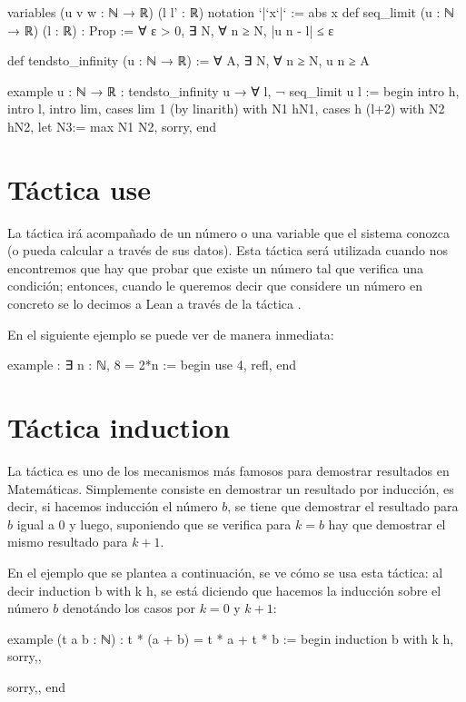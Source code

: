\begin{leancode}
variables (u v w : ℕ → ℝ) (l l' : ℝ)
notation `|`x`|` := abs x
def seq_limit (u : ℕ → ℝ) (l : ℝ) : Prop :=
∀ ε > 0, ∃ N, ∀ n ≥ N, |u n - l| ≤ ε

def tendsto_infinity (u : ℕ → ℝ) := ∀ A, ∃ N, ∀ n ≥ N, u n ≥ A

example {u : ℕ → ℝ} : tendsto_infinity u → ∀ l, ¬ seq_limit u l :=
begin
  intro h,
  intro l,
  intro lim,
  cases lim 1 (by linarith) with N1 hN1,
  cases h (l+2) with N2 hN2,
  let N3:= max N1 N2,
  sorry,
end
\end{leancode}

\section{Táctica use}
La táctica  irá acompañado de un número o una variable que
el sistema conozca (o pueda calcular a través de sus datos). Esta táctica será
utilizada cuando nos encontremos que hay que probar que existe un número tal
que verifica una condición; entonces, cuando le queremos decir que considere un
número en concreto se lo decimos a Lean a través de la táctica
.

En el siguiente ejemplo se puede ver de manera inmediata:

\begin{leancode}
example : ∃ n : ℕ, 8 = 2*n :=
begin
  use 4,
  refl,
end
\end{leancode}


\section{Táctica induction}
La táctica  es uno de los mecanismos más famosos
para demostrar resultados en Matemáticas. Simplemente consiste en demostrar
un resultado por inducción, es decir, si hacemos inducción el número \(b\),
se tiene que demostrar el resultado para \(b\) igual a \(0\) y luego, suponiendo
que se verifica para \(k=b\) hay que demostrar el mismo resultado para \(k+1\).

En el ejemplo que se plantea a continuación, se ve cómo se usa esta táctica:
al decir induction b with k h, se está diciendo que hacemos la inducción sobre
el número \(b\) denotándo los casos por \(k=0\) y \(k+1\):

\begin{leancode}
example (t a b : ℕ) : t * (a + b) = t * a + t * b :=
begin
induction b with k h,
{sorry,},

{sorry,},
end
\end{leancode}

